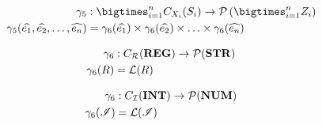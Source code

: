 \begin{align}
    \concrete_5 &: \bigtimes_{i = 1}^{n}C_{X_i}(S_i) \rightarrow \mathcal{P}\left(\bigtimes_{i = 1}^n Z_i \right) \\
    \concrete_5(\ab{e_1}, \ab{e_2}, \dots, \ab{e_n}) &= \concrete_6(\ab{e_1}) \times \concrete_6(\ab{e_2}) \times \dots \times \concrete_6(\ab{e_n})
\end{align}

\begin{align}
    \gamma_6 &: C_{\mathcal{R}}(\mathbf{REG}) \rightarrow \mathcal{P}(\mathbf{STR}) \\
    \gamma_6(R) &= \mathcal{L}(R)
\end{align}

\begin{align}
    \gamma_6 &: C_{\mathcal{\mathcal{I}}}(\mathbf{INT}) \rightarrow \mathcal{P}(\mathbf{NUM}) \\
    \gamma_6(\mathscr{I}) &= \mathcal{L}(\mathscr{I})
\end{align}



